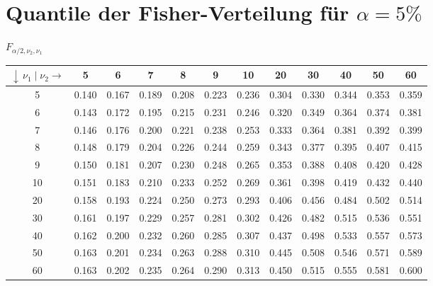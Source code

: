 \pagebreak


\section{Quantile der Fisher-Verteilung für $\alpha = 5 \%$}

$F_{\alpha/2,\nu_2, \nu_1}$

\vspace{1mm}

\begin{footnotesize}

\begin{tabular}{|c||c|c|c|c|c|c|c|c|c|c|c|}
\hline
 $\downarrow \, \nu_1 \; | \; \nu_2 \rightarrow$  & 5 & 6 & 7 & 8 & 9 & 10 & 20 & 30 & 40 & 50 & 60 \\
\hline\hline
 5 & 0.140 & 0.167 & 0.189 & 0.208 & 0.223 & 0.236 & 0.304 & 0.330 & 0.344 & 0.353 & 0.359 \\
\hline
 6 & 0.143 & 0.172 & 0.195 & 0.215 & 0.231 & 0.246 & 0.320 & 0.349 & 0.364 & 0.374 & 0.381 \\
\hline
 7 & 0.146 & 0.176 & 0.200 & 0.221 & 0.238 & 0.253 & 0.333 & 0.364 & 0.381 & 0.392 & 0.399 \\
\hline
 8 & 0.148 & 0.179 & 0.204 & 0.226 & 0.244 & 0.259 & 0.343 & 0.377 & 0.395 & 0.407 & 0.415 \\
\hline
 9 & 0.150 & 0.181 & 0.207 & 0.230 & 0.248 & 0.265 & 0.353 & 0.388 & 0.408 & 0.420 & 0.428 \\
\hline
 10 & 0.151 & 0.183 & 0.210 & 0.233 & 0.252 & 0.269 & 0.361 & 0.398 & 0.419 & 0.432 & 0.440 \\
\hline
 20 & 0.158 & 0.193 & 0.224 & 0.250 & 0.273 & 0.293 & 0.406 & 0.456 & 0.484 & 0.502 & 0.514 \\
\hline
 30 & 0.161 & 0.197 & 0.229 & 0.257 & 0.281 & 0.302 & 0.426 & 0.482 & 0.515 & 0.536 & 0.551 \\
\hline
 40 & 0.162 & 0.200 & 0.232 & 0.260 & 0.285 & 0.307 & 0.437 & 0.498 & 0.533 & 0.557 & 0.573 \\
\hline
 50 & 0.163 & 0.201 & 0.234 & 0.263 & 0.288 & 0.310 & 0.445 & 0.508 & 0.546 & 0.571 & 0.589 \\
\hline
 60 & 0.163 & 0.202 & 0.235 & 0.264 & 0.290 & 0.313 & 0.450 & 0.515 & 0.555 & 0.581 & 0.600 \\
\hline
\end{tabular}
\end{footnotesize}

\vspace{1mm}

